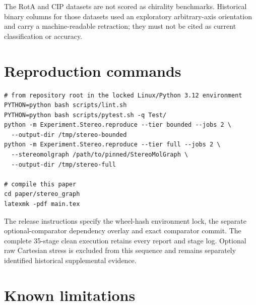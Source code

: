 \documentclass[pdflatex,sn-mathphys-num,referee,lineno]{sn-jnl}
\theoremstyle{plain}
\theoremstyle{remark}
\theoremstyle{definition}
\begin{document}
The RotA and CIP datasets are not scored as chirality benchmarks.  Historical
binary columns for those datasets used an exploratory arbitrary-axis
orientation and carry a machine-readable retraction; they must not be cited as
current classification or accuracy.

\section{Reproduction commands}

\begin{verbatim}
# from repository root in the locked Linux/Python 3.12 environment
PYTHON=python bash scripts/lint.sh
PYTHON=python bash scripts/pytest.sh -q Test/
python -m Experiment.Stereo.reproduce --tier bounded --jobs 2 \
  --output-dir /tmp/stereo-bounded
python -m Experiment.Stereo.reproduce --tier full --jobs 2 \
  --stereomolgraph /path/to/pinned/StereoMolGraph \
  --output-dir /tmp/stereo-full

# compile this paper
cd paper/stereo_graph
latexmk -pdf main.tex
\end{verbatim}

The release instructions specify the wheel-hash environment lock, the separate
optional-comparator dependency overlay and exact comparator commit. The
complete 35-stage clean execution retains every report and stage log. Optional
raw Cartesian stress is excluded from this sequence and remains separately
identified historical supplemental evidence.

\section{Known limitations}
\end{document}
